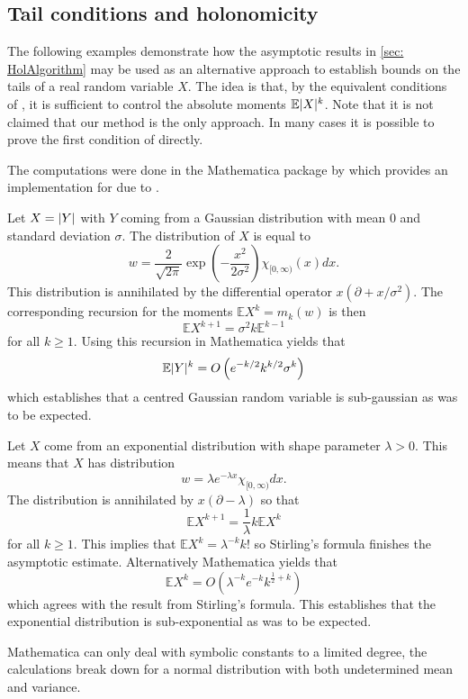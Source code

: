 \subsection{Tail conditions and holonomicity}
The following examples demonstrate how the asymptotic results in \cref{sec: HolAlgorithm} may be used as an alternative approach to establish bounds on the tails of a real random variable $X$.
The idea is that, by the equivalent conditions of , it is sufficient to control the absolute moments $\mathbb{E}\vert X \vert^k$.
Note that it is not claimed that our method is the only approach.
In many cases it is possible to prove the first condition of  directly.

The computations were done in the Mathematica package by \cite{kauers2011mathematica} which provides an implementation for  due to \cite{birkhoff1933analytic}.
\begin{example}
  Let $X=\vert Y \vert$ with $Y$ coming from a Gaussian distribution with mean $0$ and standard deviation $\sigma$.
  The distribution of $X$ is equal to
  $$w = \frac{2}{\sqrt{2\pi}}\exp\left(-\frac{x^2}{2\sigma^2}\right)\chi_{[0,\infty)}(x)dx.$$
  This distribution is annihilated by the differential operator $x(\partial + x/\sigma^2).$
  The corresponding recursion for the moments $\mathbb{E}X^k = m_k(w)$ is then
  $$\mathbb{E}X^{k+1}= \sigma^2 k\mathbb{E}^{k-1} $$
  for all $k\geq 1$.
  Using this recursion in Mathematica yields that
  $$\mathbb{E}\vert Y \vert^{k} = O\left(e^{-k/2}k^{k/2}\sigma^k\right) $$
  which establishes that a centred Gaussian random variable is sub-gaussian as was to be expected.
\end{example}
\begin{example}
  Let $X$ come from an exponential distribution with shape parameter $\lambda>0$.
  This means that $X$ has distribution
  $$w =  \lambda e^{-\lambda x} \chi_{[0,\infty)} dx.$$
  The distribution is annihilated by $x(\partial - \lambda )$ so that
  $$\mathbb{E}X^{k+1}= \frac{1}{\lambda}k\mathbb{E}X^k$$
  for all $k\geq 1$.
  This implies that $\mathbb{E}X^k = \lambda^{-k}k!$ so Stirling's formula finishes the asymptotic estimate.
  Alternatively Mathematica yields that
  $$\mathbb{E}X^k = O(\lambda^{-k}e^{-k}k^{\frac{1}{2} + k}) $$
  which agrees with the result from Stirling's formula.
  This establishes that the exponential distribution is sub-exponential as was to be expected.
\end{example}
Mathematica can only deal with symbolic constants to a limited degree, the calculations break down for a normal distribution with both undetermined mean and variance.
